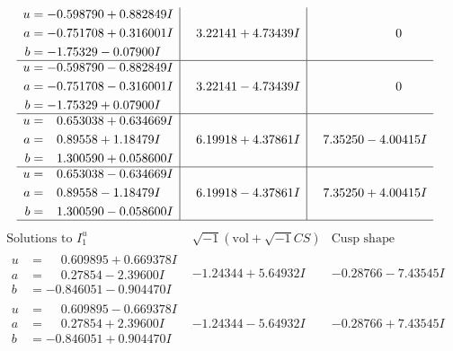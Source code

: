 \documentclass[1p]{elsarticle_modified}
\theoremstyle{definition}
\newcommand{\I}{\sqrt{-1}}
\begin{document}
$$\begin{array}{c|c|c}
\begin{aligned}
u &= -0.598790 + 0.882849 I \\
a &= -0.751708 + 0.316001 I \\
b &= -1.75329 - 0.07900 I\end{aligned}
 & \phantom{-}3.22141 + 4.73439 I & \phantom{-0.000000 } 0 \\ \hline\begin{aligned}
u &= -0.598790 - 0.882849 I \\
a &= -0.751708 - 0.316001 I \\
b &= -1.75329 + 0.07900 I\end{aligned}
 & \phantom{-}3.22141 - 4.73439 I & \phantom{-0.000000 } 0 \\ \hline\begin{aligned}
u &= \phantom{-}0.653038 + 0.634669 I \\
a &= \phantom{-}0.89558 + 1.18479 I \\
b &= \phantom{-}1.300590 + 0.058600 I\end{aligned}
 & \phantom{-}6.19918 + 4.37861 I & \phantom{-}7.35250 - 4.00415 I \\ \hline\begin{aligned}
u &= \phantom{-}0.653038 - 0.634669 I \\
a &= \phantom{-}0.89558 - 1.18479 I \\
b &= \phantom{-}1.300590 - 0.058600 I\end{aligned}
 & \phantom{-}6.19918 - 4.37861 I & \phantom{-}7.35250 + 4.00415 I\\
 \hline 
 \end{array}$$\newpage$$\begin{array}{c|c|c}  
\text{Solutions to }I^u_{1}& \I (\text{vol} + \sqrt{-1}CS) & \text{Cusp shape}\\
 \hline 
\begin{aligned}
u &= \phantom{-}0.609895 + 0.669378 I \\
a &= \phantom{-}0.27854 - 2.39600 I \\
b &= -0.846051 - 0.904470 I\end{aligned}
 & -1.24344 + 5.64932 I & -0.28766 - 7.43545 I \\ \hline\begin{aligned}
u &= \phantom{-}0.609895 - 0.669378 I \\
a &= \phantom{-}0.27854 + 2.39600 I \\
b &= -0.846051 + 0.904470 I\end{aligned}
 & -1.24344 - 5.64932 I & -0.28766 + 7.43545 I \\ \hline\begin{aligned}

\end{aligned}
\end{array}$$
\end{document}
